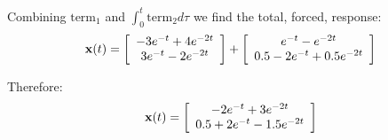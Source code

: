 Combining $\mathrm{term}_1$ and $\int_0^t \mathrm{term}_2 d\tau$ we find the total, forced, response:
\[
{\bf{x}}(t) = \left[ {\begin{array}{*{20}c}
   { - 3e^{ - t}  + 4e^{ - 2t} }  \\
   {3e^{ - t}  - 2e^{ - 2t} }  \\
\end{array}} \right] + \left[ {\begin{array}{*{20}c}
   {e^{ - t}  - e^{ - 2t} }  \\
   {0.5 - 2e^{ - t}  + 0.5e^{ - 2t} }  \\
\end{array}} \right]
\]

Therefore:
\[
{\bf{x}}(t) = \left[ {\begin{array}{*{20}c}
   { - 2e^{ - t}  + 3e^{ - 2t} }  \\
   {0.5 + 2e^{ - t}  - 1.5e^{ - 2t} }  \\
\end{array}} \right]
\]



